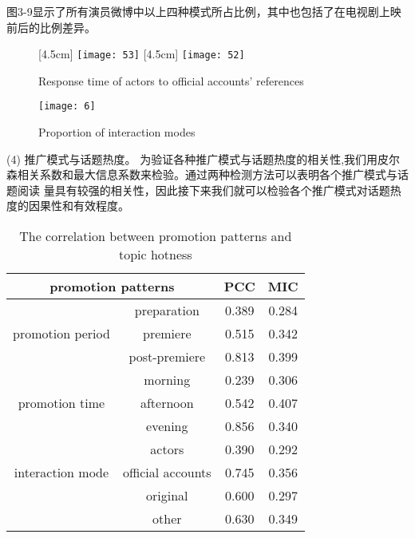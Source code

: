 图3-9显示了所有演员微博中以上四种模式所占比例，其中也包括了在电视剧上映前后的比例差异。

\begin{figure}[h]
  \centering%
  [4.5cm] 
    {\texttt{[image: 53]}}%
  \hspace{4em}%
  [4.5cm] 
      {\texttt{[image: 52]}}
  \caption{Response time of actors to official accounts' references}
  \label{fig:big1-subcaptionbox}
\end{figure}

\begin{figure}[!htbp]
\centering
\texttt{[image: 6]}
\caption{Proportion of interaction modes}
\end{figure}

(4) 推广模式与话题热度。
为验证各种推广模式与话题热度的相关性,我们用皮尔森相关系数和最大信息系数来检验。通过两种检测方法可以表明各个推广模式与话题阅读 量具有较强的相关性，因此接下来我们就可以检验各个推广模式对话题热度的因果性和有效程度。
\begin{table}[!htbp]
\centering
\caption{The correlation between promotion patterns and topic hotness}
\begin{tabular}{|c|c|c|c|} \hline
\multicolumn{2}{|c|}{promotion patterns}&PCC&MIC\\ \hline
\multirow{3}{*}{promotion period} & preparation&0.389&0.284\\%
&premiere&0.515&0.342\\%
&post-premiere&0.813&0.399\\ \hline
\multirow{3}{*}{promotion time} &morning&0.239&0.306\\%
&afternoon&0.542&0.407\\%
&evening&0.856&0.340\\ \hline
\multirow{3}{*}{interaction mode} &actors&0.390&0.292\\%
&official accounts&0.745&0.356\\%
&original&0.600&0.297\\ 
&other&0.630&0.349\\ 
\hline\end{tabular}
\end{table}

\label{sec:multifig}

